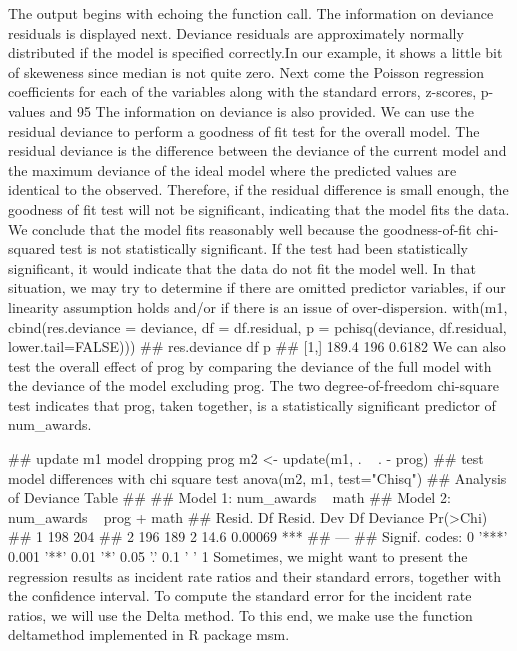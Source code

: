 The output begins with echoing the function call. The information on deviance residuals is displayed next. Deviance residuals are approximately normally distributed if the model is specified correctly.In our example, it shows a little bit of skeweness since median is not quite zero. 
Next come the Poisson regression coefficients for each of the variables along with the standard errors, z-scores, p-values and 95%
The information on deviance is also provided. We can use the residual deviance to perform a goodness of fit test for the overall model. The residual deviance is the difference between the deviance of the current model and the maximum deviance of the ideal model where the predicted values are identical to the observed. Therefore, if the residual difference is small enough, the goodness of fit test will not be significant, indicating that the model fits the data. We conclude that the model fits reasonably well because the goodness-of-fit chi-squared test is not statistically significant. If the test had been statistically significant, it would indicate that the data do not fit the model well. In that situation, we may try to determine if there are omitted predictor variables, if our linearity assumption holds and/or if there is an issue of over-dispersion.
with(m1, cbind(res.deviance = deviance, df = df.residual,
  p = pchisq(deviance, df.residual, lower.tail=FALSE)))
##      res.deviance  df      p
## [1,]        189.4 196 0.6182
We can also test the overall effect of prog by comparing the deviance of the full model with the deviance of the model excluding prog. The two degree-of-freedom chi-square test indicates that prog, taken together, is a statistically significant predictor of num_awards.

## update m1 model dropping prog
m2 <- update(m1, . ~ . - prog)
## test model differences with chi square test
anova(m2, m1, test="Chisq")
## Analysis of Deviance Table
## 
## Model 1: num_awards ~ math
## Model 2: num_awards ~ prog + math
##   Resid. Df Resid. Dev Df Deviance Pr(>Chi)    
## 1       198        204                         
## 2       196        189  2     14.6  0.00069 ***
## ---
## Signif. codes:  0 '***' 0.001 '**' 0.01 '*' 0.05 '.' 0.1 ' ' 1
Sometimes, we might want to present the regression results as incident rate ratios and their standard errors, together with the confidence interval. To compute the standard error for the incident rate ratios, we will use the Delta method. To this end, we make use the function deltamethod implemented in R package msm.

